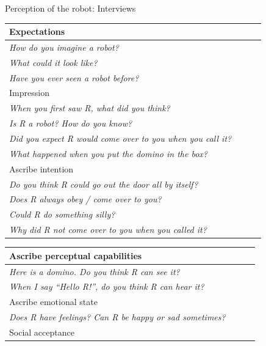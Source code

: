 \documentclass[compress]{beamer}
\renewcommand{\bf}{\Medium}
\begin{document}
\begin{frame}{Perception of the robot: Interviews}
\scriptsize
    \begin{multicols}{2}
    \begin{table}[]
        \begin{tabularx}{\linewidth}{p{0.9\linewidth}}

    \toprule
    {\bf Expectations} \tabularnewline
    \midrule
    \emph{How do you imagine a robot?} \tabularnewline
    \emph{What could it look like?} \tabularnewline
    \emph{Have you ever seen a robot before?} \tabularnewline

    \toprule
    {\bf Impression} \tabularnewline
    \midrule


    \emph{When you first saw R, what did you think?} \tabularnewline
    \emph{Is R a robot? How do you know?} \tabularnewline
    \emph{Did you expect R would come over to you when you call it?} \tabularnewline
    \emph{What happened when you put the domino in the box?} \tabularnewline

    \toprule
    {\bf Ascribe intention} \tabularnewline
    \midrule


    \emph{Do you think R could go out the door all by itself?} \tabularnewline	
    \emph{{\color{red}Does R always obey / come over to you?}} \tabularnewline
    \emph{{\color{red}Could R do something silly?}} \tabularnewline
    \emph{Why did R not come over to you when you called it?} \tabularnewline

            \bottomrule
        \end{tabularx}
        \label{tab:options}
    \end{table}

    \begin{table}[]
        \begin{tabularx}{\linewidth}{p{0.9\linewidth}}


    \toprule
    {\bf Ascribe perceptual capabilities} \tabularnewline
    \midrule


    \emph{Here is a domino. {\color{red}Do you think R can see it?}} \tabularnewline 
    \emph{When I say \textit{``Hello R!''}, do you think R can hear it?} \tabularnewline

    \toprule
    {\bf Ascribe emotional state} \tabularnewline
    \midrule


    \emph{{\color{red}Does R have feelings?} Can R be happy or sad sometimes?}
    \tabularnewline

    \toprule
    {\bf Social acceptance} \tabularnewline
    \midrule



\end{tabularx}
\end{table}
\end{multicols}
\end{frame}
\end{document}
